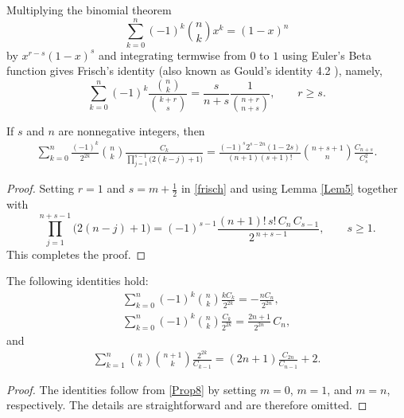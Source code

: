 \documentclass[12pt,reqno]{article}
\begin{document}
Multiplying the binomial theorem
\begin{equation*}
\sum_{k = 0}^n {( - 1)^k \binom{{n}}{k}x^k }  = \left( {1 - x} \right)^n 
\end{equation*}
by $x^{r-s}(1-x)^{s}$ and integrating termwise from $0$ to $1$ using Euler's Beta function gives Frisch's identity (also known as Gould's identity 4.2 \cite{Gould}), namely,
\begin{equation}\label{frisch}
\sum_{k = 0}^n {(-1)^k\frac{\binom nk}{\binom{k + r}s} = \frac s{n+s}\frac{1}{\binom{n+r}{n+s}}}, \qquad r \geq s.
\end{equation}
\begin{proposition}
If $s$ and $n$ are nonnegative integers, then
\begin{gather}\label{Prop8}
\sum_{k = 0}^{n} \frac{(-1)^k}{2^{2k}} \binom nk \frac {C_k}{\prod\limits_{j=1}^{s-1}\big(2(k-j)+1\big)}
= \frac{(-1)^{s} 2^{s-2n}(1-2s)}{(n+1)(s+1)!}\binom{n+s+1}{n}\frac{C_{n+s}}{C^2_s}.
\end{gather}
\end{proposition}
\begin{proof}
Setting $r=1$ and $s=m+\frac12$ in \eqref{frisch} and using Lemma \ref{Lem5} together with 
\begin{equation*}
\prod_{j=1}^{n+s-1}\big(2(n-j)+1\big) = (-1)^{s-1} \frac{(n+1)!\,s!\,C_n\,C_{s-1}}{2^{\,n+s-1}}, \qquad s\ge1.
\end{equation*}
This completes the proof. 
\end{proof}
\begin{corollary}
The following identities hold:
\begin{gather*}
\sum_{k = 0}^{n}(-1)^k \binom nk \frac{k C_k}{2^{2k}} = -\frac{n C_{n}}{2^{2n}},\\
\sum_{k = 0}^{n} (-1)^k \binom nk \frac{C_k}{2^{2k}} = \frac{2n+1}{2^{2n}}\, {C_{n}},
\end{gather*}
and
\begin{gather*}
\sum_{k = 1}^{n} \binom {n}{k}\binom {n+1}{k} \frac{2^{2k}}{C_{k-1}} = (2n+1)\frac{C_{2n}}{C_{n-1}} + 2.
\end{gather*}
\end{corollary}
\begin{proof} 
The identities follow from \eqref{Prop8} by setting $m=0$, $m=1$, and $m=n$, respectively. The details are straightforward 
and are therefore omitted.
\end{proof}
\end{document}
